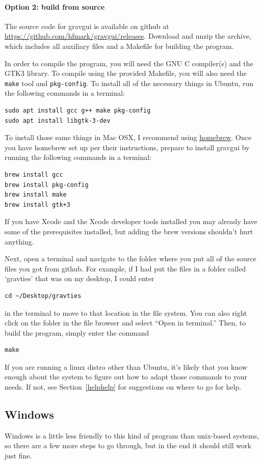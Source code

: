 \documentclass{pfpe-manual}
\begin{document}
\paragraph{Option 2: build from source}
The source code for gravgui is available on github at \url{https://github.com/hfmark/gravgui/releases}. Download and unzip the archive, which includes all auxiliary files and a Makefile for building the program.

In order to compile the program, you will need the GNU C compiler(s) and the GTK3 library. To compile using the provided Makefile, you will also need the \texttt{make} tool and \texttt{pkg-config}. To install all of the necessary things in Ubuntu, run the following commands in a terminal:
\begin{verbatim}
sudo apt install gcc g++ make pkg-config
sudo apt install libgtk-3-dev
\end{verbatim}

To install those same things in Mac OSX, I recommend using \href{https://brew.sh/}{homebrew}. Once you have homebrew set up per their instructions, prepare to install gravgui by running the following commands in a terminal:
\begin{verbatim}
brew install gcc
brew install pkg-config
brew install make
brew install gtk+3
\end{verbatim}
If you have Xcode and the Xcode developer tools installed you may already have some of the prerequisites installed, but adding the brew versions shouldn't hurt anything.

Next, open a terminal and navigate to the folder where you put all of the source files you got from github. For example, if I had put the files in a folder called `gravties' that was on my desktop, I could enter 
\begin{verbatim}
cd ~/Desktop/gravties
\end{verbatim}
in the terminal to move to that location in the file system. You can also right click on the folder in the file browser and select ``Open in terminal.'' Then, to build the program, simply enter the command
\begin{verbatim}
make
\end{verbatim}

If you are running a linux distro other than Ubuntu, it's likely that you know enough about the system to figure out how to adapt those commands to your needs. If not, see Section~\ref{helphelp} for suggestions on where to go for help.

\subsection{Windows}
\label{inst:wind}
Windows is a little less friendly to this kind of program than unix-based systems, so there are a few more steps to go through, but in the end it should still work just fine. 
\end{document}
